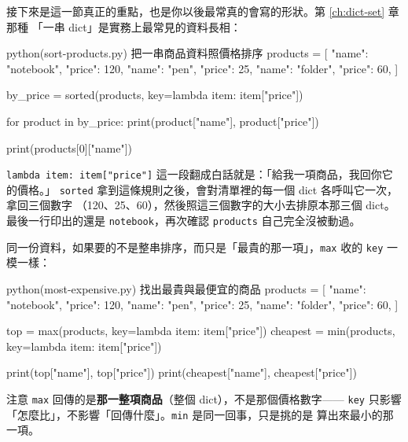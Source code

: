 接下來是這一節真正的重點，也是你以後最常真的會寫的形狀。第 \ref{ch:dict-set} 章那種
「一串 dict」是實務上最常見的資料長相：

\begin{example}{python}{(sort-products.py) 把一串商品資料照價格排序}
products = [
    {"name": "notebook", "price": 120},
    {"name": "pen", "price": 25},
    {"name": "folder", "price": 60},
]

by_price = sorted(products, key=lambda item: item["price"])

for product in by_price:
    print(product["name"], product["price"])

print(products[0]["name"])
\end{example}


\texttt{lambda item: item["price"]} 這一段翻成白話就是：「給我一項商品，我回你它的價格。」
\texttt{sorted} 拿到這條規則之後，會對清單裡的每一個 dict 各呼叫它一次，拿回三個數字
（120、25、60），然後照這三個數字的大小去排原本那三個 dict。最後一行印出的還是
\texttt{notebook}，再次確認 \texttt{products} 自己完全沒被動過。

同一份資料，如果要的不是整串排序，而只是「最貴的那一項」，\texttt{max} 收的
\texttt{key} 一模一樣：

\begin{example}{python}{(most-expensive.py) 找出最貴與最便宜的商品}
products = [
    {"name": "notebook", "price": 120},
    {"name": "pen", "price": 25},
    {"name": "folder", "price": 60},
]

top = max(products, key=lambda item: item["price"])
cheapest = min(products, key=lambda item: item["price"])

print(top["name"], top["price"])
print(cheapest["name"], cheapest["price"])
\end{example}


注意 \texttt{max} 回傳的是\textbf{那一整項商品}（整個 dict），不是那個價格數字——
\texttt{key} 只影響「怎麼比」，不影響「回傳什麼」。\texttt{min} 是同一回事，只是挑的是
算出來最小的那一項。



